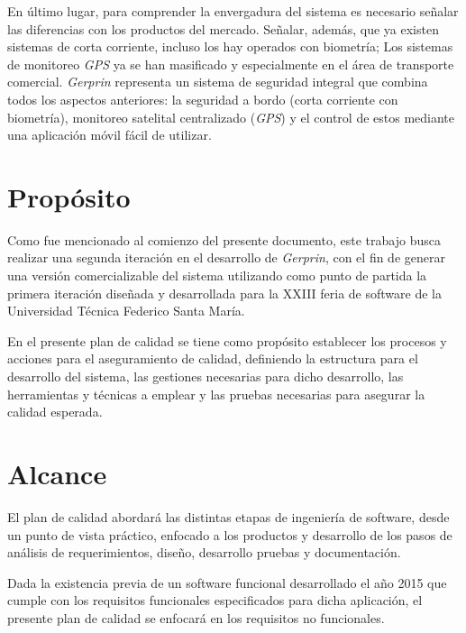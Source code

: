  En último lugar, para comprender la envergadura del sistema es necesario señalar las diferencias con los productos del mercado. Señalar, además, que ya existen sistemas de corta corriente, incluso los hay operados con biometría; Los sistemas de monitoreo \textit{GPS} ya se han masificado y especialmente en el área de transporte comercial. \textit{Gerprin} representa un sistema de seguridad integral que combina todos los aspectos anteriores: la seguridad a bordo (corta corriente con biometría), monitoreo satelital centralizado (\textit{GPS}) y el control de estos mediante una aplicación móvil fácil de utilizar.

\section{Propósito}

Como fue mencionado al comienzo del presente documento, este trabajo busca realizar una segunda iteración en el desarrollo de \textit{Gerprin}, con el fin de generar una versión comercializable del sistema utilizando como punto de partida la primera iteración diseñada y desarrollada para la XXIII feria de software de la Universidad Técnica Federico Santa María.

En el presente plan de calidad se tiene como propósito establecer los procesos y acciones para el aseguramiento de calidad, definiendo la estructura para el desarrollo del sistema, las gestiones necesarias para dicho desarrollo, las herramientas y técnicas a emplear y las pruebas necesarias para asegurar la calidad esperada.

\section{Alcance}

El plan de calidad abordará las distintas etapas de ingeniería de software, desde un punto de vista práctico, enfocado a los productos y desarrollo de los pasos de análisis de requerimientos, diseño, desarrollo pruebas y documentación.

Dada la existencia previa de un software funcional desarrollado el año 2015 que cumple con los requisitos funcionales especificados para dicha aplicación, el presente plan de calidad se enfocará en los requisitos no funcionales.